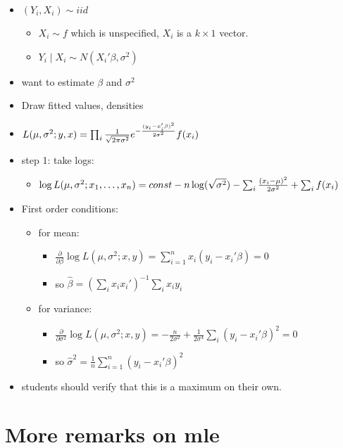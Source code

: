 \begin{itemize}
\item $(Y_i,X_i) \sim iid$
\begin{itemize}
\item $X_i \sim f$ which is unspecified, $X_i$ is a $k\times1$ vector.
\item $Y_i \mid X_i \sim N(X_i'\beta, \sigma^2)$
\end{itemize}
\item want to estimate $\beta$ and $\sigma^2$
\item Draw fitted values, densities
\item $L(\mu,\sigma^2; y, x) = \prod_i {1 \over \sqrt{2 \pi \sigma^2}} e^{- {(y_i - x_i'\beta)^2 \over 2 \sigma^2}} f(x_i)$
\item step 1: take logs:
\begin{itemize}
\item $\log L(\mu,\sigma^2; x_1,\dots,x_n) = const - n\log
         (\sqrt{\sigma^2}) - \sum_i {(x_i - \mu)^2 \over 2 \sigma^2} + \sum_i f(x_i)$
\end{itemize}
\item First order conditions:
\begin{itemize}
\item for mean:
\begin{itemize}
\item $\frac{\partial}{\partial \beta} \log L(\mu, \sigma^2; x, y) = \sum_{i=1}^n x_i (y_i - x_i'\beta) = 0$
\item so $\hat\beta=(\sum_i x_i x_i')^{-1} \sum_i x_i y_i$
\end{itemize}
\item for variance:
\begin{itemize}
\item $\frac{\partial}{\partial \sigma^2} \log L(\mu, \sigma^2; x, y) = -\frac{n}{2\sigma^2} + \frac{1}{2 \sigma^4}\sum_i (y_i - x_i'\beta)^2 = 0$
\item so $\hat\sigma^2 = \frac{1}{n} \sum_{i=1}^n (y_i - x_i'\beta)^2$
\end{itemize}
\end{itemize}
\item students should verify that this is a maximum on their own.
\end{itemize}
\section{More remarks on mle}
\label{sec-4}


